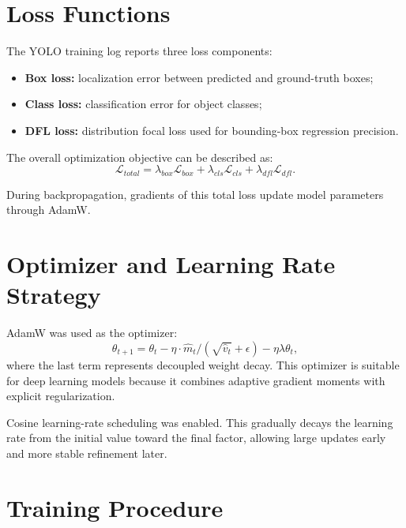 \documentclass[12pt,a4paper]{article}
\begin{document}
\section{Loss Functions}

The YOLO training log reports three loss components:
\begin{itemize}[noitemsep]
    \item \textbf{Box loss:} localization error between predicted and ground-truth boxes;
    \item \textbf{Class loss:} classification error for object classes;
    \item \textbf{DFL loss:} distribution focal loss used for bounding-box regression precision.
\end{itemize}

The overall optimization objective can be described as:
\[
\mathcal{L}_{total} =
\lambda_{box}\mathcal{L}_{box}
+
\lambda_{cls}\mathcal{L}_{cls}
+
\lambda_{dfl}\mathcal{L}_{dfl}.
\]

During backpropagation, gradients of this total loss update model parameters through AdamW.

\section{Optimizer and Learning Rate Strategy}

AdamW was used as the optimizer:
\[
\theta_{t+1} = \theta_t - \eta \cdot \hat{m}_t / (\sqrt{\hat{v}_t}+\epsilon) - \eta\lambda\theta_t,
\]
where the last term represents decoupled weight decay. This optimizer is suitable for deep learning models because it combines adaptive gradient moments with explicit regularization.

Cosine learning-rate scheduling was enabled. This gradually decays the learning rate from the initial value toward the final factor, allowing large updates early and more stable refinement later.

\section{Training Procedure}
\end{document}

